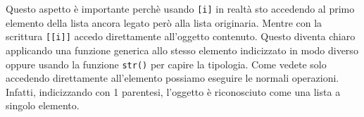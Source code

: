 \documentclass[
]{book}
\newenvironment{Shaded}{\begin{snugshade}}{\end{snugshade}}
\newcommand{\CommentTok}[1]{\textcolor[rgb]{0.56,0.35,0.01}{\textit{#1}}}
\newcommand{\DataTypeTok}[1]{\textcolor[rgb]{0.13,0.29,0.53}{#1}}
\newcommand{\DecValTok}[1]{\textcolor[rgb]{0.00,0.00,0.81}{#1}}
\newcommand{\KeywordTok}[1]{\textcolor[rgb]{0.13,0.29,0.53}{\textbf{#1}}}
\newcommand{\NormalTok}[1]{#1}
\newcommand{\OperatorTok}[1]{\textcolor[rgb]{0.81,0.36,0.00}{\textbf{#1}}}
\newcommand{\StringTok}[1]{\textcolor[rgb]{0.31,0.60,0.02}{#1}}
\begin{document}
\begin{Shaded}
\end{Shaded}

Questo aspetto è importante perchè usando \texttt{{[}i{]}} in realtà sto accedendo al primo elemento della lista ancora legato però alla lista originaria. Mentre con la scrittura \texttt{{[}{[}i{]}{]}} accedo direttamente all'oggetto contenuto. Questo diventa chiaro applicando una funzione generica allo stesso elemento indicizzato in modo diverso oppure usando la funzione \texttt{str()} per capire la tipologia. Come vedete solo accedendo direttamente all'elemento possiamo eseguire le normali operazioni. Infatti, indicizzando con 1 parentesi, l'oggetto è riconosciuto come una lista a singolo elemento.
\end{document}
